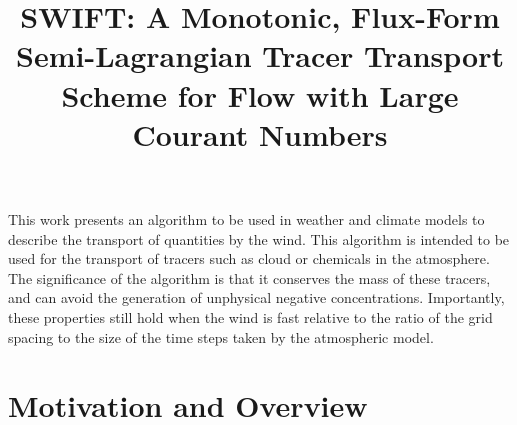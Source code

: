 \documentclass{ametsocV6.1}
\title{SWIFT: A Monotonic, Flux-Form Semi-Lagrangian Tracer Transport Scheme for Flow with Large Courant Numbers}
\affiliation{\aff{a}{Dynamics Research, Met Office, Exeter, UK}}
\begin{document}
\maketitle


\statement
This work presents an algorithm to be used in weather and climate models to describe the transport of quantities by the wind.
This algorithm is intended to be used for the transport of tracers such as cloud or chemicals in the atmosphere.
The significance of the algorithm is that it conserves the mass of these tracers, and can avoid the generation of unphysical negative concentrations. Importantly, these properties still hold when the wind is fast relative to the ratio of the grid spacing to the size of the time steps taken by the atmospheric model.

%

%

\section{Motivation and Overview} \label{sec:intro}
\end{document}
